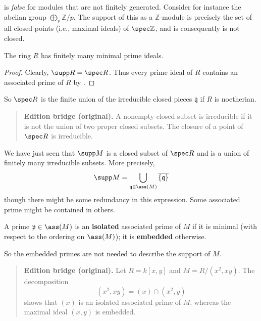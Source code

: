 \begin{example} 
 is \emph{false} for modules that are not finitely
generated. Consider for instance the abelian group $\bigoplus_p \mathbb{Z}/p$.
The support of this as a $\mathbb{Z}$-module is precisely the set of all
closed points (i.e., maximal ideals) of $\spec \mathbb{Z}$, and is
consequently is not closed. 
\end{example} 

\begin{corollary} 
The ring $R$ has finitely many minimal prime ideals. 
\end{corollary} 
\begin{proof} 
Clearly, $\supp R = \spec R$. Thus every prime ideal of $R$
contains an associated prime of $R$ by .
\end{proof} 

So $\spec R$ is the finite union of the  irreducible closed  pieces
$\overline{\mathfrak{q}}$ if $R$ is noetherian.
\begin{quote}\small\textbf{Edition bridge (original).}
A nonempty closed subset is irreducible if it is not the union of two proper
closed subsets.  The closure of a point of $\spec R$ is irreducible.\end{quote}

We have just seen that $\supp M$ is a closed subset of $\spec R$ and is a union
of finitely many irreducible subsets.  More precisely, 
\[ \supp M = \bigcup_{\mathfrak{q} \in \ass(M)}
\overline{\left\{\mathfrak{q}\right\}}  \]
though there might be some redundancy in this expression. Some associated prime might be contained
in others.  

\begin{definition} 
A prime $\mathfrak{p} \in \ass(M)$ is an \textbf{isolated} associated prime of
$M$ if it is minimal (with respect to the ordering on $\ass(M)$); it is
\textbf{embedded} otherwise. 
\end{definition} 

So the embedded primes are not needed to describe the support of $M$. 

\begin{quote}\small\textbf{Edition bridge (original).}
Let $R=k[x,y]$ and $M=R/(x^2,xy)$.  The decomposition
\[
  (x^2,xy)=(x)\cap(x^2,y)
\]
shows that $(x)$ is an isolated associated prime of $M$, whereas the maximal
ideal $(x,y)$ is embedded.\end{quote}

